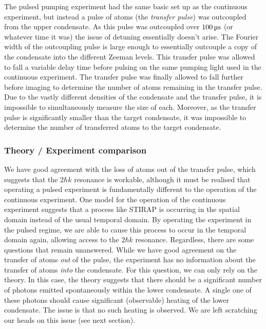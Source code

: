 The pulsed pumping experiment had the same basic set up as the continuous experiment, but instead a pulse of atoms (the \emph{transfer pulse}) was outcoupled from the upper condensate.  As this pulse was outcoupled over $\unit[100]{\micro s}$ (or whatever time it was) the issue of detuning essentially doesn't arise.  The Fourier width of the outcoupling pulse is large enough to essentially outcouple a copy of the condensate into the different Zeeman levels.  This transfer pulse was allowed to fall a variable delay time before pulsing on the same pumping light used in the continuous experiment.  The transfer pulse was finally allowed to fall further before imaging to determine the number of atoms remaining in the transfer pulse.  Due to the vastly different densities of the condensate and the transfer pulse, it is impossible to simultaneously measure the size of each.  Moreover, as the transfer pulse is significantly smaller than the target condensate, it was impossible to determine the number of transferred atoms to the target condensate.

\subsubsection{Theory / Experiment comparison}

We have good agreement with the loss of atoms out of the transfer pulse, which suggests that the $2 \hbar k$ resonance is workable, although it must be realised that operating a pulsed experiment is fundamentally different to the operation of the continuous experiment.  One model for the operation of the continuous experiment suggests that a process like STIRAP is occurring in the spatial domain instead of the usual temporal domain.  By operating the experiment in the pulsed regime, we are able to cause this process to occur in the temporal domain again, allowing access to the $2 \hbar k$ resonance.  Regardless, there are some questions that remain unanswered.  While we have good agreement on the transfer of atoms \emph{out} of the pulse, the experiment has no information about the transfer of atoms \emph{into} the condensate.  For this question, we can only rely on the theory.  In this case, the theory suggests that there should be a significant number of photons emitted spontaneously within the lower condensate.  A single one of these photons should cause significant (observable) heating of the lower condensate.  The issue is that no such heating is observed.  We are left scratching our heads on this issue (see next section).

